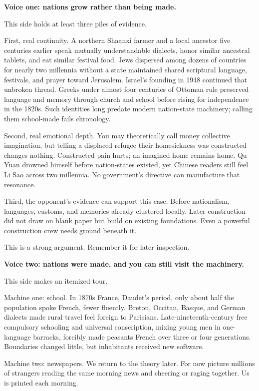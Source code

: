 \textbf{Voice one: nations grow rather than being made.}

This side holds at least three piles of evidence.

First, real continuity. A northern Shaanxi farmer and a local ancestor five centuries earlier speak mutually understandable dialects, honor similar ancestral tablets, and eat similar festival food. Jews dispersed among dozens of countries for nearly two millennia without a state maintained shared scriptural language, festivals, and prayer toward Jerusalem. Israel's founding in 1948 continued that unbroken thread. Greeks under almost four centuries of Ottoman rule preserved language and memory through church and school before rising for independence in the 1820s. Such identities long predate modern nation-state machinery; calling them school-made fails chronology.

Second, real emotional depth. You may theoretically call money collective imagination, but telling a displaced refugee their homesickness was constructed changes nothing. Constructed pain hurts; an imagined home remains home. Qu Yuan drowned himself before nation-states existed, yet Chinese readers still feel Li Sao across two millennia. No government's directive can manufacture that resonance.

Third, the opponent's evidence can support this case. Before nationalism, languages, customs, and memories already clustered locally. Later construction did not draw on blank paper but build on existing foundations. Even a powerful construction crew needs ground beneath it.

This is a strong argument. Remember it for later inspection.

\textbf{Voice two: nations were made, and you can still visit the machinery.}

This side makes an itemized tour.

Machine one: school. In 1870s France, Daudet's period, only about half the population spoke French, fewer fluently. Breton, Occitan, Basque, and German dialects made rural travel feel foreign to Parisians. Late-nineteenth-century free compulsory schooling and universal conscription, mixing young men in one-language barracks, forcibly made peasants French over three or four generations. Boundaries changed little, but inhabitants received new software.

Machine two: newspapers. We return to the theory later. For now picture millions of strangers reading the same morning news and cheering or raging together. Us is printed each morning.

